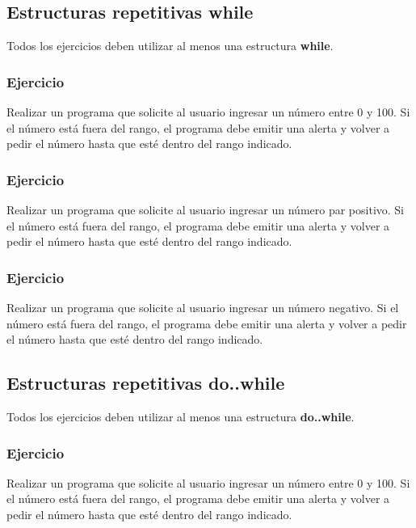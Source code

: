 \subsection*{Estructuras repetitivas while}
Todos los ejercicios deben utilizar al menos una estructura \textbf{while}.
\subsubsection{Ejercicio}
Realizar un programa que solicite al usuario ingresar un número entre 0 y 100. Si el número está fuera del rango, el programa debe emitir una alerta y volver a pedir el número hasta que esté dentro del rango indicado.


\subsubsection{Ejercicio}
Realizar un programa que solicite al usuario ingresar un número par positivo. Si el número está fuera del rango, el programa debe emitir una alerta y volver a pedir el número hasta que esté dentro del rango indicado.


\subsubsection{Ejercicio}
Realizar un programa que solicite al usuario ingresar un número negativo. Si el número está fuera del rango, el programa debe emitir una alerta y volver a pedir el número hasta que esté dentro del rango indicado.

\subsection*{Estructuras repetitivas do..while}
Todos los ejercicios deben utilizar al menos una estructura \textbf{do..while}.
\subsubsection{Ejercicio}
Realizar un programa que solicite al usuario ingresar un número entre 0 y 100. Si el número está fuera del rango, el programa debe emitir una alerta y volver a pedir el número hasta que esté dentro del rango indicado.


